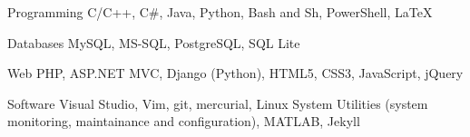 
\begin{cvskills}

  \cvskill
    {Programming} %
    {C/C++, C\#, Java, Python, Bash and Sh, PowerShell, LaTeX} %

  \cvskill
    {Databases} %
    {MySQL, MS-SQL, PostgreSQL, SQL Lite} %

  \cvskill
    {Web} %
    {PHP, ASP.NET MVC, Django (Python), HTML5, CSS3, JavaScript, jQuery} %

  \cvskill
    {Software} %
    {Visual Studio, Vim, git, mercurial, Linux System Utilities (system monitoring, maintainance and configuration), MATLAB, Jekyll} %

\end{cvskills}
